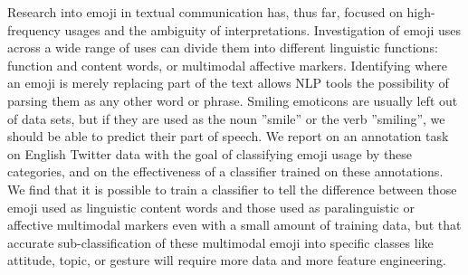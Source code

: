 Research into emoji in textual communication has, thus far, focused on high-frequency usages and the ambiguity of interpretations. Investigation of emoji uses across a wide range of uses can divide them into different linguistic functions: function and content words, or multimodal affective markers. Identifying where an emoji is merely replacing part of the text allows NLP tools the possibility of parsing them as any other word or phrase. Smiling emoticons are usually left out of data sets, but if they are used as the noun ''smile'' or the verb ''smiling'', we should be able to predict their part of speech. We report on an annotation task on English Twitter data with the goal of classifying emoji usage by these categories, and on the effectiveness of a classifier trained on these annotations. We find that it is possible to train a classifier to tell the difference between those emoji used as linguistic content words and those used as paralinguistic or affective multimodal markers even with a small amount of training data, but that accurate sub-classification of these multimodal emoji into specific classes like attitude, topic, or gesture will require more data and more feature engineering.
